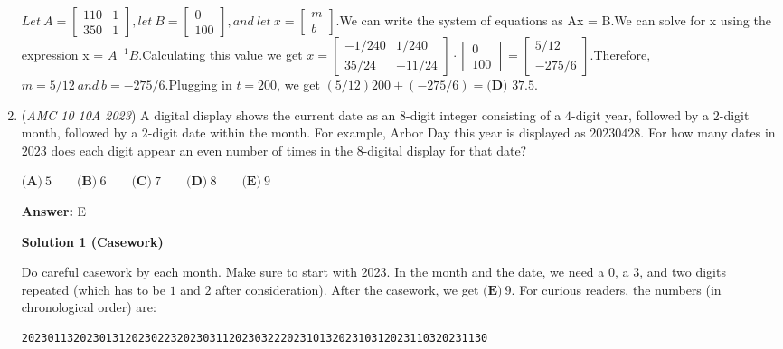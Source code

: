 \begin{enumerate}
 $Let \: A =\begin{bmatrix} 110 & 1 \\ 350 & 1 \end{bmatrix}, let \: B = \begin{bmatrix} 0 \\ 100 \end{bmatrix}, and \: let \: x = \begin{bmatrix} m \\ b \end{bmatrix}.$We can write the system of equations as Ax = B.We can solve for x using the expression x = $A^{-1}B$.Calculating this value we get $x = \begin{bmatrix} -1/240 & 1/240 \\ 35/24 & -11/24 \end{bmatrix}\cdot\begin{bmatrix} 0 \\ 100 \end{bmatrix}=\begin{bmatrix} 5/12 \\ -275/6 \end{bmatrix}.$Therefore, $m = 5/12 \: and \: b = -275/6$.Plugging in $t = 200$, we get $(5/12)200+(-275/6) = \boxed{\textbf{(D) }37.5}$.

 


 


	\item (\textit{AMC 10 10A 2023}) A digital display shows the current date as an $8$-digit integer consisting of a $4$-digit year, followed by a $2$-digit month, followed by a $2$-digit date within the month. For example, Arbor Day this year is displayed as $20230428.$ For how many dates in $2023$ does each digit appear an even number of times in the $8$-digital display for that date?


 $\textbf{(A)}~5\qquad\textbf{(B)}~6\qquad\textbf{(C)}~7\qquad\textbf{(D)}~8\qquad\textbf{(E)}~9$

 \textbf{Answer: }E



\textbf{Solution 1 (Casework)}

Do careful casework by each month. Make sure to start with 2023. In the month and the date, we need a $0$, a $3$, and two digits repeated (which has to be $1$ and $2$ after consideration). After the casework, we get $\boxed{\textbf{(E)}~9}$. For curious readers, the numbers (in chronological order) are:

 \begin{verbatim}
202301132023013120230223202303112023032220231013202310312023110320231130
\end{verbatim}






\end{enumerate}
